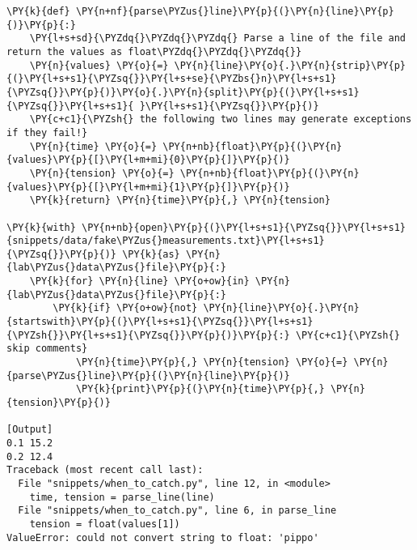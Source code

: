 \begin{Verbatim}[label=\makebox{\url{https://github.com/lucabaldini/cmepda/tree/master/slides/latex/snippets/when\_to\_catch.py}},commandchars=\\\{\}]
\PY{k}{def} \PY{n+nf}{parse\PYZus{}line}\PY{p}{(}\PY{n}{line}\PY{p}{)}\PY{p}{:}
    \PY{l+s+sd}{\PYZdq{}\PYZdq{}\PYZdq{} Parse a line of the file and return the values as float\PYZdq{}\PYZdq{}\PYZdq{}}
    \PY{n}{values} \PY{o}{=} \PY{n}{line}\PY{o}{.}\PY{n}{strip}\PY{p}{(}\PY{l+s+s1}{\PYZsq{}}\PY{l+s+se}{\PYZbs{}n}\PY{l+s+s1}{\PYZsq{}}\PY{p}{)}\PY{o}{.}\PY{n}{split}\PY{p}{(}\PY{l+s+s1}{\PYZsq{}}\PY{l+s+s1}{ }\PY{l+s+s1}{\PYZsq{}}\PY{p}{)}
    \PY{c+c1}{\PYZsh{} the following two lines may generate exceptions if they fail!}
    \PY{n}{time} \PY{o}{=} \PY{n+nb}{float}\PY{p}{(}\PY{n}{values}\PY{p}{[}\PY{l+m+mi}{0}\PY{p}{]}\PY{p}{)}
    \PY{n}{tension} \PY{o}{=} \PY{n+nb}{float}\PY{p}{(}\PY{n}{values}\PY{p}{[}\PY{l+m+mi}{1}\PY{p}{]}\PY{p}{)}
    \PY{k}{return} \PY{n}{time}\PY{p}{,} \PY{n}{tension}

\PY{k}{with} \PY{n+nb}{open}\PY{p}{(}\PY{l+s+s1}{\PYZsq{}}\PY{l+s+s1}{snippets/data/fake\PYZus{}measurements.txt}\PY{l+s+s1}{\PYZsq{}}\PY{p}{)} \PY{k}{as} \PY{n}{lab\PYZus{}data\PYZus{}file}\PY{p}{:}
    \PY{k}{for} \PY{n}{line} \PY{o+ow}{in} \PY{n}{lab\PYZus{}data\PYZus{}file}\PY{p}{:}
        \PY{k}{if} \PY{o+ow}{not} \PY{n}{line}\PY{o}{.}\PY{n}{startswith}\PY{p}{(}\PY{l+s+s1}{\PYZsq{}}\PY{l+s+s1}{\PYZsh{}}\PY{l+s+s1}{\PYZsq{}}\PY{p}{)}\PY{p}{:} \PY{c+c1}{\PYZsh{} skip comments}
            \PY{n}{time}\PY{p}{,} \PY{n}{tension} \PY{o}{=} \PY{n}{parse\PYZus{}line}\PY{p}{(}\PY{n}{line}\PY{p}{)}
            \PY{k}{print}\PY{p}{(}\PY{n}{time}\PY{p}{,} \PY{n}{tension}\PY{p}{)}

[Output]
0.1 15.2
0.2 12.4
Traceback (most recent call last):
  File "snippets/when_to_catch.py", line 12, in <module>
    time, tension = parse_line(line)
  File "snippets/when_to_catch.py", line 6, in parse_line
    tension = float(values[1])
ValueError: could not convert string to float: 'pippo'
\end{Verbatim}